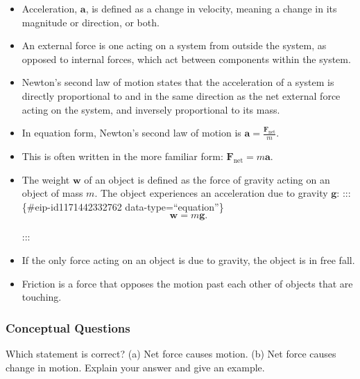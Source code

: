 \documentclass[
]{book}
\begin{document}
\begin{itemize}
\item
  \protect\hypertarget{import-auto-id2667164}{}{Acceleration, \(\textbf{a}{}\), is defined as a change in velocity,
  meaning a change in its magnitude or direction, or
  both.}
\item
  \protect\hypertarget{import-auto-id2677227}{}{An external force is one acting on a system from outside the
  system, as opposed to internal forces, which act between components
  within the system.}
\item
  \protect\hypertarget{import-auto-id2937300}{}{Newton's second law of motion states that the acceleration of a
  system is directly proportional to and in the same direction as the
  net external force acting on the system, and inversely proportional
  to its mass.}
\item
  \protect\hypertarget{import-auto-id3028474}{}{In equation form, Newton's second law of motion is
  \({\textbf{a} = \frac{\textbf{F}_{\text{net}}}{m}}{}\).}
\item
  \protect\hypertarget{import-auto-id2962786}{}{This is often written in the more familiar form:
  \({\textbf{F}_{\text{net}} = m\textbf{a}}{}\).}
\item
  \protect\hypertarget{import-auto-id1487682}{}{The weight \(\textbf{w}{}\) of an object is defined as the force of
  gravity acting on an object of mass \(m{}\). The object experiences an
  acceleration due to gravity \(\textbf{g}{}\):}
  ::: \{\#eip-id1171442332762 data-type=``equation''\}
  \[{\textbf{w} = m\textbf{g}}.\]

  :::
\item
  \protect\hypertarget{import-auto-id3397737}{}{If the only force acting on an object is due to gravity, the object
  is in free fall.}
\item
  \protect\hypertarget{import-auto-id1917983}{}{Friction is a force that opposes the motion past each other of
  objects that are touching.}
\end{itemize}

\hypertarget{fs-id3158911}{}
\hypertarget{conceptual-questions-13}{%
\subsubsection{Conceptual Questions}\label{conceptual-questions-13}}

\hypertarget{fs-id2928601}{}
\leavevmode{}%
Which statement is correct? (a) Net force causes motion. (b) Net force
causes change in motion. Explain your answer and give an example.
\end{document}
